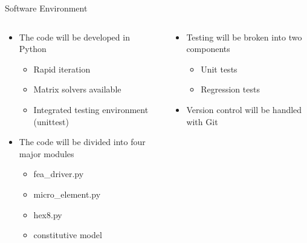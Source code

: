 \documentclass[11pt]{beamer}
\begin{document}
\begin{frame}{Software Environment}

\begin{columns}
\begin{column}{0.5\textwidth}
\begin{itemize}
\item {The code will be developed in Python
\begin{itemize}
\item Rapid iteration
\item Matrix solvers available
\item Integrated testing environment (unittest)
\end{itemize}
}
\item{The code will be divided into four major modules
\begin{itemize}
\item fea\_driver.py
\item micro\_element.py
\item hex8.py
\item constitutive model
\end{itemize}
}
\end{itemize}
\end{column}
\begin{column}{0.5\textwidth}
\begin{itemize}
\item{
Testing will be broken into two components
\begin{itemize}
\item Unit tests
\item Regression tests
\end{itemize}
}
\item{
Version control will be handled with Git
}
\end{itemize}
\end{column}
\end{columns}

\end{frame}
\end{document}
